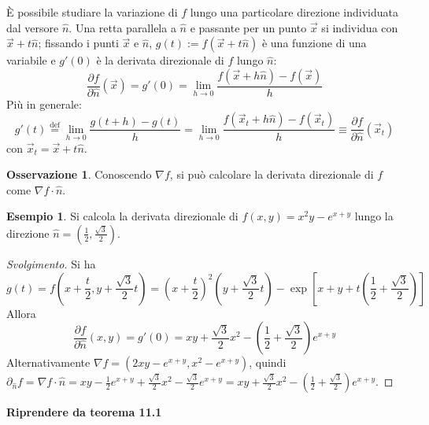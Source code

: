 \documentclass[10pt, a4paper]{scrartcl}
\newenvironment{svolgimento}{\renewcommand\qedsymbol{$\blacksquare$}\begin{proof}[Svolgimento]}{\end{proof}}
\theoremstyle{definition}
\newtheorem{esempio}{Esempio}
\numberwithin{esempio}{section}
\theoremstyle{definition}
\newtheorem{obs}{Osservazione}
\numberwithin{obs}{section}
\numberwithin{nota}{section}
\numberwithin{equation}{subsection}
\begin{document}
\`E possibile studiare la variazione di $f$ lungo una particolare direzione individuata dal versore $\hat{n}$. Una retta parallela a $\hat{n}$ e passante per un punto $\vec{x}$ si individua con $\vec{x}+t \hat{n}$; fissando i punti $\vec{x}$ e $\hat{n}$, $g(t) := f(\vec{x}+t\hat{n})$ \`e una funzione di una variabile e $g'(0)$ \`e la derivata direzionale di $f$ lungo $\hat{n}$:
\begin{equation}
	\frac{\partial f}{\partial \hat{n}} (\vec{x}) = g'(0) = \lim_{h \to 0} \frac{f(\vec{x}+h\hat{n}) - f(\vec{x})}{h}
\end{equation}
Pi\`u in generale:
\begin{equation}
	g'(t) \overset{\text{def}}{=} \lim_{h \to 0} \frac{g(t+h) - g(t)}{h} = \lim_{h \to 0} \frac{f(\vec{x}_t+ h \hat{n}) - f(\vec{x}_t)}{h} \equiv \frac{\partial f}{\partial \hat{n}} (\vec{x}_t)
\end{equation}
con $\vec{x}_t = \vec{x}+t \hat{n}$. 
\begin{obs}
	Conoscendo $\nabla f$, si pu\`o calcolare la derivata direzionale di $f$ come $\nabla f \cdot \hat{n}$.
\end{obs}
\begin{esempio}
	Si calcola la derivata direzionale di $f(x,y) = x^2 y - e^{x+y} $ lungo la direzione $\hat{n} = \left(\frac{1}{2}, \frac{\sqrt{3} }{2}\right) $.
	\begin{svolgimento}
		Si ha 
		\[
		g(t) = f\left(x + \frac{t}{2}, y + \frac{\sqrt{3} }{2}t\right) = \left(x + \frac{t}{2}\right) ^2 \left(y + \frac{\sqrt{3} }{2}t\right) - \exp \left[ x + y + t\left(\frac{1}{2} + \frac{\sqrt{3} }{2}\right)  \right] 
		\] 
		Allora 
		\[
		\frac{\partial f}{\partial \hat{n}} (x,y) = g'(0) = xy + \frac{\sqrt{3} }{2}x^2 - \left(\frac{1}{2}+ \frac{\sqrt{3} }{2} \right) e^{x+y} 
		\] 
		Alternativamente $\nabla f = \left(2xy - e^{x+y} , x^2 - e^{x+y} \right) $, quindi $\partial _{\hat{n}} f = \nabla f \cdot \hat{n} =xy - \frac{1}{2} e^{x+y} +\frac{\sqrt{3} }{2} x^2 - \frac{\sqrt{3} }{2}e^{x+y} = xy + \frac{\sqrt{3} }{2}x^2 - \left(\frac{1}{2}+\frac{\sqrt{3} }{2}\right) e^{x+y}   $.
	\end{svolgimento}
\end{esempio}
\begin{center}
\textbf{Riprendere da teorema 11.1} 	
\end{center}
\end{document}
